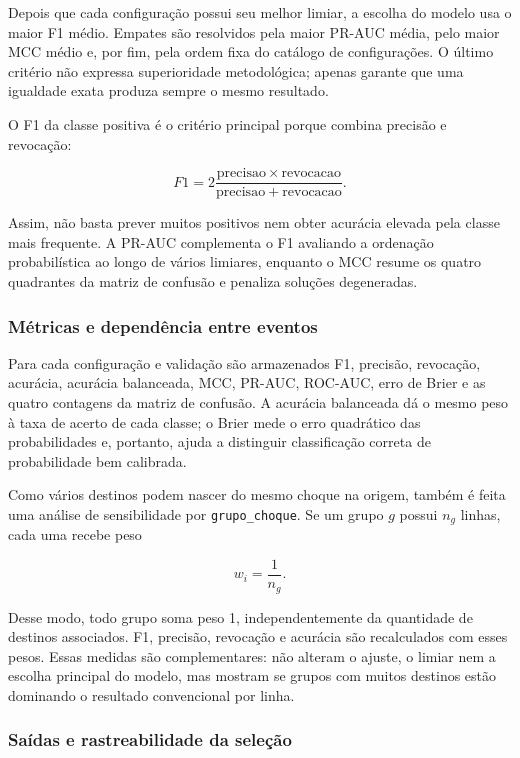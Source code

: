 \documentclass[12pt,a4paper]{article}
\begin{document}
Depois que cada configuração possui seu melhor limiar, a escolha do modelo
usa o maior F1 médio. Empates são resolvidos pela maior PR-AUC média, pelo maior
MCC médio e, por fim, pela ordem fixa do catálogo de configurações. O último
critério não expressa superioridade metodológica; apenas garante que uma
igualdade exata produza sempre o mesmo resultado.

O F1 da classe positiva é o critério principal porque combina precisão e
revocação:

\begin{equation}
    F1=2\frac{\mathrm{precisao}\times\mathrm{revocacao}}
    {\mathrm{precisao}+\mathrm{revocacao}}.
\end{equation}

Assim, não basta prever muitos positivos nem obter acurácia elevada pela classe
mais frequente. A PR-AUC complementa o F1 avaliando a ordenação probabilística
ao longo de vários limiares, enquanto o MCC resume os quatro quadrantes da
matriz de confusão e penaliza soluções degeneradas.

\subsubsection{Métricas e dependência entre eventos}

Para cada configuração e validação são armazenados F1, precisão, revocação,
acurácia, acurácia balanceada, MCC, PR-AUC, ROC-AUC, erro de Brier e as quatro
contagens da matriz de confusão. A acurácia balanceada dá o mesmo peso à taxa
de acerto de cada classe; o Brier mede o erro quadrático das probabilidades e,
portanto, ajuda a distinguir classificação correta de probabilidade bem
calibrada.

Como vários destinos podem nascer do mesmo choque na origem, também é feita
uma análise de sensibilidade por \texttt{grupo\_choque}. Se um grupo $g$
possui $n_g$ linhas, cada uma recebe peso

\begin{equation}
    w_i=\frac{1}{n_g}.
\end{equation}

Desse modo, todo grupo soma peso 1, independentemente da quantidade de destinos
associados. F1, precisão, revocação e acurácia são recalculados com esses pesos.
Essas medidas são complementares: não alteram o ajuste, o limiar nem a escolha
principal do modelo, mas mostram se grupos com muitos destinos estão dominando
o resultado convencional por linha.

\subsubsection{Saídas e rastreabilidade da seleção}
\end{document}
